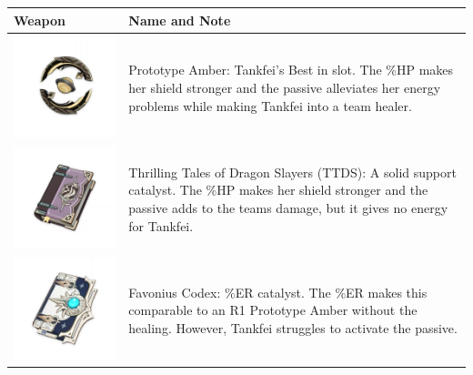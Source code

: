 \documentclass[11pt]{article}
\begin{document}
\begin{tabular}{| m{}  | m{} |}
\hline Weapon & Name and Note \\
\hline  \includegraphics[scale = 0.18]{WeaponPrototypeAmber.png}  & Prototype Amber: Tankfei's Best in slot. The \%HP makes her shield stronger and the passive alleviates her energy problems while making Tankfei into a team healer. \\
\hline  \includegraphics[scale = 0.18]{WeaponThrillingTalesofDragonSlayers.png}  & Thrilling Tales of Dragon Slayers (TTDS): A solid support catalyst. The \%HP makes her shield stronger and the passive adds to the teams damage, but it gives no energy for Tankfei. \\
\hline  \includegraphics[scale = 0.18]{WeaponFavoniusCodex.png}  & Favonius Codex: \%ER catalyst. The \%ER makes this comparable to an R1 Prototype Amber without the healing. However, Tankfei struggles to activate the passive. \\

\end{tabular}
\end{document}
